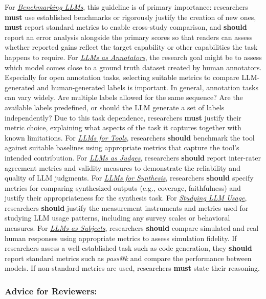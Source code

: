 \documentclass[smallextended]{svjour3}
\newcommand{\must}{\textbf{must}\xspace}
\newcommand{\should}{\textbf{should}\xspace}
\newcommand{\annotators}{\hyperref[sec:llms-as-annotators]{\emph{LLMs as Annotators}}\xspace}
\newcommand{\judges}{\hyperref[sec:llms-as-judges]{\emph{LLMs as Judges}}\xspace}
\newcommand{\synthesis}{\hyperref[sec:llms-for-synthesis]{\emph{LLMs for Synthesis}}\xspace}
\newcommand{\subjects}{\hyperref[sec:llms-as-subjects]{\emph{LLMs as Subjects}}\xspace}
\newcommand{\llmusage}{\hyperref[sec:studying-llm-usage-in-software-engineering]{\emph{Studying LLM Usage}}\xspace}
\newcommand{\newtools}{\hyperref[sec:llms-for-new-software-engineering-tools]{\emph{LLMs for Tools}}\xspace}
\newcommand{\benchmarkingtasks}{\hyperref[sec:benchmarking-llms-for-software-engineering-tasks]{\emph{Benchmarking LLMs}}\xspace}
\newcommand{\annotators}{\href{/study-types\#llms-as-annotators}{\emph{LLMs as Annotators}}\xspace}
\newcommand{\judges}{\href{/study-types\#llms-as-judges}{\emph{LLMs as Judges}}\xspace}
\newcommand{\synthesis}{\href{/study-types\#llms-for-synthesis}{\emph{LLMs for Synthesis}}\xspace}
\newcommand{\subjects}{\href{/study-types\#llms-as-subjects}{\emph{LLMs as Subjects}}\xspace}
\newcommand{\llmusage}{\href{/study-types\#studying-llm-usage-in-software-engineering}{\emph{Studying LLM Usage}}\xspace}
\newcommand{\newtools}{\href{/study-types\#llms-for-new-software-engineering-tools}{\emph{LLMs for Tools}}\xspace}
\newcommand{\benchmarkingtasks}{\href{/study-types\#benchmarking-llms-for-software-engineering-tasks}{\emph{Benchmarking LLMs}}\xspace}
\newcommand{\guidelinesubsubsection}[1]{\subsubsection{\bfseries #1:}}
\newcommand{\guidelinesubsubsection}[1]{\subsubsection{#1}}
\begin{document}
For \benchmarkingtasks, this guideline is of primary importance: researchers \must use established benchmarks or rigorously justify the creation of new ones, \must report standard metrics to enable cross-study comparison, and \should report an error analysis alongside the primary scores so that readers can assess whether reported gains reflect the target capability or other capabilities the task happens to require.
For \annotators, the research goal might be to assess which model comes close to a ground truth dataset created by human annotators.
Especially for open annotation tasks, selecting suitable metrics to compare LLM-generated and human-generated labels is important.
In general, annotation tasks can vary widely.
Are multiple labels allowed for the same sequence? Are the available labels predefined, or should the LLM generate a set of labels independently?
Due to this task dependence, researchers \must justify their metric choice, explaining what aspects of the task it captures together with known limitations.
For \newtools, researchers \should benchmark the tool against suitable baselines using appropriate metrics that capture the tool's intended contribution.
For \judges, researchers \should report inter-rater agreement metrics and validity measures to demonstrate the reliability and quality of LLM judgments.
For \synthesis, researchers \should specify metrics for comparing synthesized outputs (e.g., coverage, faithfulness) and justify their appropriateness for the synthesis task.
For \llmusage, researchers \should justify the measurement instruments and metrics used for studying LLM usage patterns, including any survey scales or behavioral measures.
For \subjects, researchers \should compare simulated and real human responses using appropriate metrics to assess simulation fidelity.
If researchers assess a well-established task such as code generation, they \should report standard metrics such as \emph{pass@k} and compare the performance between models.
If non-standard metrics are used, researchers \must state their reasoning.

\guidelinesubsubsection{Advice for Reviewers}
\end{document}
